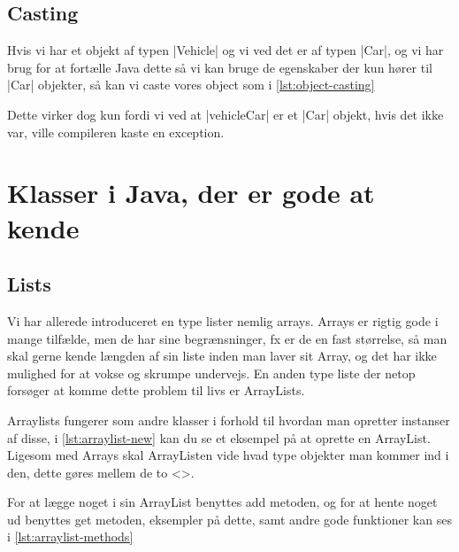 \subsection{Casting}

Hvis vi har et objekt af typen \JavaInline|Vehicle| og vi ved det er af typen \JavaInline|Car|, og vi har brug for at fortælle Java dette så vi kan bruge de egenskaber der kun hører til \JavaInline|Car| objekter, så kan vi caste vores object som i \autoref{lst:object-casting}

 \begin{JavaCode}{Casting af objekt}{lst:object-methods}
 	//this works because of inheritance
 	Vehicle vehicleCar = new Car();
 	//casting car as Car
 	Car car = (Car)vehicleCar;
 }
\end{JavaCode}

Dette virker dog kun fordi vi ved at \JavaInline|vehicleCar| er et \JavaInline|Car| objekt, hvis det ikke var, ville compileren kaste en exception.

\section{Klasser i Java, der er gode at kende}

\subsection{Lists}

Vi har allerede introduceret en type lister nemlig arrays. Arrays er rigtig gode i mange tilfælde, men de har sine begrænsninger, fx er de en fast størrelse, så man skal gerne kende længden af sin liste inden man laver sit Array, og det har ikke mulighed for at vokse og skrumpe undervejs. En anden type liste der netop forsøger at komme dette problem til livs er ArrayLists.

Arraylists fungerer som andre klasser i forhold til hvordan man opretter instanser af disse, i \autoref{lst:arraylist-new} kan du se et eksempel på at oprette en ArrayList. Ligesom med Arrays skal ArrayListen vide hvad type objekter man kommer ind i den, dette gøres mellem de to <>.

\begin{JavaCode}{Oprettelse af ArrayList}{lst:arraylist-new}
	//varible of type ArrayList
	ArrayList<String> list = new ArrayList<String>();
}
\end{JavaCode}

For at lægge noget i sin ArrayList benyttes add metoden, og for at hente noget ud benyttes get metoden, eksempler på dette, samt andre gode funktioner kan ses i \autoref{lst:arraylist-methods}

